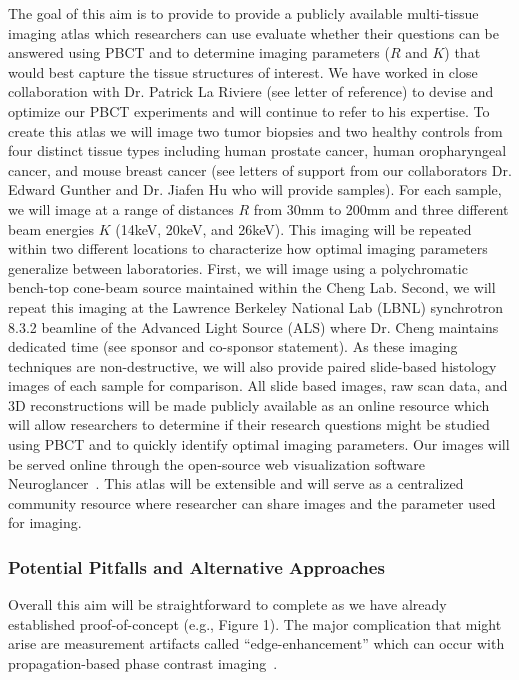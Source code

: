 \documentclass{NIHGrant}
\theoremstyle{theorem}
\begin{document}
The goal of this aim is to provide to provide a publicly available multi-tissue
imaging atlas which researchers can use evaluate whether their questions
can be answered using PBCT and to determine imaging parameters (\(R\) and \(K\))
that would best capture the tissue structures of interest. We have worked in close collaboration with Dr. Patrick La Riviere (see letter of reference) to devise and optimize our PBCT experiments and will continue to refer to his expertise. To create this atlas
we will image two tumor biopsies and two healthy controls from four distinct
tissue types including human prostate cancer, human oropharyngeal cancer, and mouse
breast cancer (see letters of support from our collaborators Dr. Edward Gunther and Dr. Jiafen Hu who will
provide samples). For each sample, we will image at a range of distances \(R\)
from 30mm to 200mm and three different beam energies \(K\) (14keV, 20keV, and
26keV). This imaging will be repeated within two different locations to
characterize how optimal imaging parameters generalize between laboratories.
First, we will image using a polychromatic bench-top cone-beam source maintained within the
Cheng Lab. Second, we will repeat this imaging at the Lawrence Berkeley National
Lab (LBNL) synchrotron 8.3.2 beamline of the Advanced Light Source (ALS) where Dr.
Cheng maintains dedicated time (see sponsor and co-sponsor statement). As these imaging
techniques are non-destructive, we will also provide paired slide-based
histology images of each sample for comparison. All slide based images, raw scan
data, and 3D reconstructions will be made publicly available as an online
resource which will allow researchers to determine if their research questions
might be studied using PBCT and to quickly identify optimal imaging parameters.
Our images will be served online through the open-source web visualization
software Neuroglancer~\cite{google_neuroglancer_2023}. This atlas will be extensible and will serve as a
centralized community resource where researcher can share images and the
parameter used for imaging.

\subsubsection*{Potential Pitfalls and Alternative Approaches}
Overall this aim will be straightforward to complete as we have already
established proof-of-concept (e.g., Figure 1). The major complication that
might arise are measurement artifacts called ``edge-enhancement'' which can
occur with propagation-based phase contrast imaging~\cite{cheng_whole-animal_2011,ding_computational_2019}.
\end{document}
